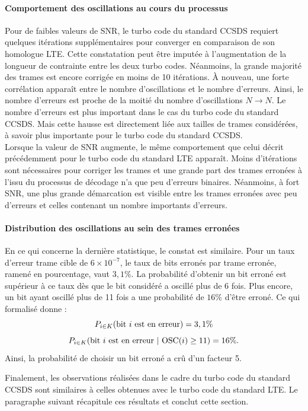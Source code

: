 \paragraph*{Comportement des oscillations au cours du processus}
Pour de faibles valeurs de SNR, le turbo code du standard CCSDS requiert quelques itérations supplémentaires pour converger en comparaison de son homologue
LTE. Cette constatation peut être imputée à l'augmentation de la longueur de contrainte entre les deux turbo codes. Néanmoins,
la grande majorité des trames est encore corrigée en moins de 10 itérations. À nouveau, une forte corrélation apparaît 
entre le nombre d'oscillations et le nombre d'erreurs. Ainsi, le nombre d'erreurs est proche de la moitié du nombre d'oscillations
$N \rightarrow N$. Le nombre d'erreurs est plus important dans le cas du turbo code du standard CCSDS. Mais cette hausse est
directement liée aux tailles de trames considérées, à savoir plus importante pour le turbo code du standard CCSDS.\\
Lorsque la valeur de SNR augmente, le même comportement que celui décrit précédemment pour le turbo code du standard LTE apparaît. 
Moins d'itérations sont nécessaires pour corriger les trames et une grande part des trames erronées à l'issu du processus de décodage 
n'a que peu d'erreurs binaires. Néanmoins, à fort SNR, une plus grande démarcation est visible entre les trames erronées 
avec peu d'erreurs et celles contenant un nombre importants d'erreurs.
\paragraph*{Distribution des oscillations au sein des trames erronées}
En ce qui concerne la dernière statistique, le constat est similaire. Pour un  taux d'erreur trame 
cible de $6\times 10^{-7}$, le taux de bits erronés par trame erronée, ramené en pourcentage, vaut $3,1\%$. La probabilité
d'obtenir un bit erroné est supérieur à ce taux dès que le bit considéré a oscillé plus de 6 fois. Plus encore, un bit 
ayant oscillé plus de 11 fois a une probabilité de $16\%$ d'être erroné. Ce qui formalisé donne :
\[P_{i \in K} (\textnormal{bit } i \textnormal{ est en erreur}) = 3,1 \%\]
\[P_{i \in K} (\textnormal{bit } i \textnormal{ est en erreur}\ |\ \textnormal{OSC}(i) \geq 11 ) = 16 \%.\] 
Ainsi, la probabilité de choisir un bit erroné a crû d'un facteur 5. 

Finalement, les observations réalisées dans le cadre du turbo code du standard CCSDS sont similaires à celles obtenues avec
le turbo code du standard LTE. Le paragraphe suivant récapitule ces résultats et conclut cette section.

